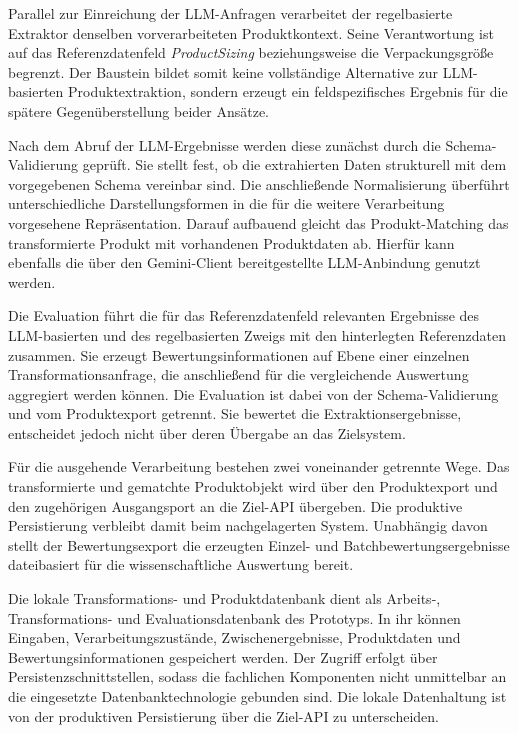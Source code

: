 Parallel zur Einreichung der LLM-Anfragen verarbeitet der regelbasierte Extraktor denselben vorverarbeiteten Produktkontext. Seine Verantwortung ist auf das Referenzdatenfeld 
\textit{ProductSizing} beziehungsweise die Verpackungsgröße begrenzt. Der Baustein bildet somit keine vollständige Alternative zur LLM-basierten Produktextraktion, sondern 
erzeugt ein feldspezifisches Ergebnis für die spätere Gegenüberstellung beider Ansätze.

Nach dem Abruf der LLM-Ergebnisse werden diese zunächst durch die Schema-Validierung geprüft. Sie stellt fest, ob die extrahierten Daten strukturell mit dem vorgegebenen 
Schema vereinbar sind. Die anschließende Normalisierung überführt unterschiedliche Darstellungsformen in die für die weitere Verarbeitung vorgesehene Repräsentation. Darauf 
aufbauend gleicht das Produkt-Matching das transformierte Produkt mit vorhandenen Produktdaten ab. Hierfür kann ebenfalls die über den Gemini-Client bereitgestellte 
LLM-Anbindung genutzt werden.

Die Evaluation führt die für das Referenzdatenfeld relevanten Ergebnisse des LLM-basierten und des regelbasierten Zweigs mit den hinterlegten Referenzdaten zusammen. Sie 
erzeugt Bewertungsinformationen auf Ebene einer einzelnen Transformationsanfrage, die anschließend für die vergleichende Auswertung aggregiert werden können. Die Evaluation 
ist dabei von der Schema-Validierung und vom Produktexport getrennt. Sie bewertet die Extraktionsergebnisse, entscheidet jedoch nicht über deren Übergabe an das Zielsystem.

Für die ausgehende Verarbeitung bestehen zwei voneinander getrennte Wege. Das transformierte und gematchte Produktobjekt wird über den Produktexport und den zugehörigen 
Ausgangsport an die Ziel-API übergeben. Die produktive Persistierung verbleibt damit beim nachgelagerten System. Unabhängig davon stellt der Bewertungsexport die erzeugten 
Einzel- und Batchbewertungsergebnisse dateibasiert für die wissenschaftliche Auswertung bereit.

Die lokale Transformations- und Produktdatenbank dient als Arbeits-, Transformations- und Evaluationsdatenbank des Prototyps. In ihr können Eingaben, Verarbeitungszustände, 
Zwischenergebnisse, Produktdaten und Bewertungsinformationen gespeichert werden. Der Zugriff erfolgt über Persistenzschnittstellen, sodass die fachlichen Komponenten nicht 
unmittelbar an die eingesetzte Datenbanktechnologie gebunden sind. Die lokale Datenhaltung ist von der produktiven Persistierung über die Ziel-API zu unterscheiden.

